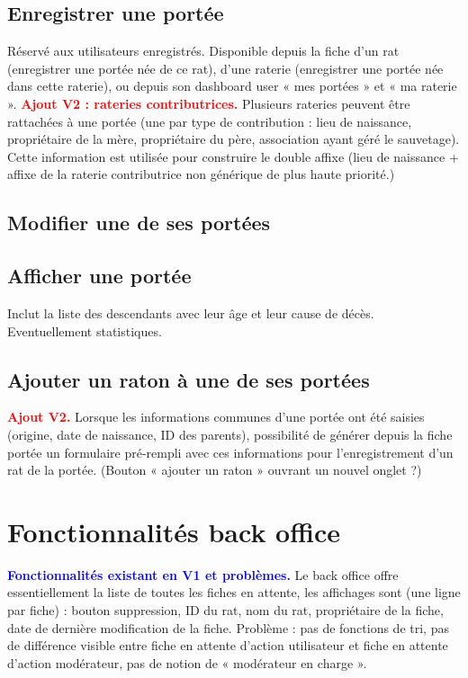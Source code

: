 ﻿\documentclass[a4paper,10pt]{article}
\newcommand\existant[1]{\noindent\textbf{\textcolor{blue}{#1}}}
\newcommand\desire[1]{\noindent\textbf{\textcolor{red}{#1}}}
\begin{document}
\subsection{Enregistrer une portée}
Réservé aux utilisateurs enregistrés. Disponible depuis la fiche d'un rat (enregistrer une portée née de ce rat), d'une raterie (enregistrer une portée née dans cette raterie), ou depuis son dashboard user « mes portées » et « ma raterie ». \desire{Ajout V2 : rateries contributrices.} Plusieurs rateries peuvent être rattachées à une portée (une par type de contribution : lieu de naissance, propriétaire de la mère, propriétaire du père, association ayant géré le sauvetage). Cette information est utilisée pour construire le double affixe (lieu de naissance + affixe de la raterie contributrice non générique de plus haute priorité.)  

\subsection{Modifier une de ses portées} 

\subsection{Afficher une portée} 
Inclut la liste des descendants avec leur âge et leur cause de décès. Eventuellement statistiques.

\subsection{Ajouter un raton à une de ses portées}
 
\desire{Ajout V2.} Lorsque les informations communes d'une portée ont été saisies (origine, date de naissance, ID des parents), possibilité de générer depuis la fiche portée un formulaire pré-rempli avec ces informations pour l'enregistrement d'un rat de la portée. (Bouton « ajouter un raton » ouvrant un nouvel onglet ?)  

\section{Fonctionnalités back office}
\label{sec:backoffice}
\existant{Fonctionnalités existant en V1 et problèmes.} Le back office offre essentiellement la liste de toutes les fiches en attente, les affichages sont (une ligne par fiche) : bouton suppression, ID du rat, nom du rat, propriétaire de la fiche, date de dernière modification de la fiche. Problème : pas de fonctions de tri, pas de différence visible entre fiche en attente d'action utilisateur et fiche en attente d'action modérateur, pas de notion de « modérateur en charge ».  
\end{document}
